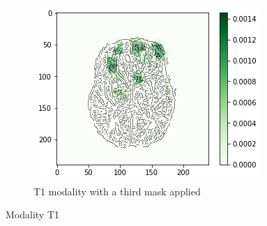 \begin{figure}[H]
    \begin{subfigure}[t]{.45\textwidth}
        \centering
        \includegraphics[width=\linewidth]{chapters/06_hdm/c_Brats18_2013_17_1_L1/44.png}
        \caption{T1 modality with a third mask applied}
    \end{subfigure}
    \caption{Modality T1}
\end{figure}

